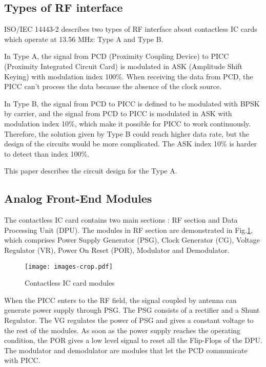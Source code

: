 \subsection{Types of RF interface}
ISO/IEC 14443-2 describes two types of RF interface about contactless IC cards which operate at 13.56 MHz: Type A and Type B. 

In Type A, the signal from PCD (Proximity Coupling Device) to PICC (Proximity Integrated Circuit Card) is modulated in ASK (Amplitude Shift Keying) with modulation index 100\%. When receiving the data from PCD, the PICC can’t process the data because the absence of the clock source. 

In Type B,  the signal from PCD to PICC is defined to be modulated with BPSK by carrier, and the signal from PCD to PICC is modulated in ASK with modulation index 10\%, which make it possible for PICC to work continuously. Therefore, the solution given by Type B could reach higher data rate, but the design of the circuits would be more complicated. The ASK index 10\% is harder to detect than index 100\%.

This paper describes the circuit design for the Type A. 


\subsection{Analog Front-End Modules}

The contactless IC card contains two main sections \cite{rfid_interface}: RF section and Data Processing Unit (DPU). The modules in RF section are demonstrated in Fig.\ref{fig:modules}, which comprises Power Supply Generator (PSG), Clock Generator (CG), Voltage Regulator (VR), Power On Reset (POR), Modulator  and Demodulator. 

\begin{figure}[]
  \centering
  \texttt{[image: images-crop.pdf]}
  \caption{Contactless IC card modules}
  \label{fig:modules}
\end{figure}

When the PICC enters to the RF field, the signal coupled by antenna can generate power supply through PSG. The PSG consists of a rectifier and a Shunt Regulator. The VG regulates the power of PSG and gives a constant voltage to the rest of the modules. As soon as the power supply reaches the operating condition, the POR gives a low level signal to reset all the Flip-Flops of the DPU. The modulator and demodulator are modules that let the PCD communicate with PICC.